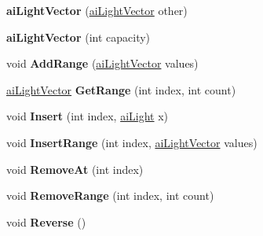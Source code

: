 \begin{DoxyCompactItemize}
\item 
\hypertarget{classai_light_vector_ac10f5a7cfb0ddbe7bda375740838a58e}{{\bfseries ai\+Light\+Vector} (\hyperlink{classai_light_vector}{ai\+Light\+Vector} other)}\label{classai_light_vector_ac10f5a7cfb0ddbe7bda375740838a58e}

\item 
\hypertarget{classai_light_vector_ae79283f10ffcfa603ce8a5c0c572d365}{{\bfseries ai\+Light\+Vector} (int capacity)}\label{classai_light_vector_ae79283f10ffcfa603ce8a5c0c572d365}

\item 
\hypertarget{classai_light_vector_a4a0e3aa1cef39c2d66b2d6bd88f3a000}{void {\bfseries Add\+Range} (\hyperlink{classai_light_vector}{ai\+Light\+Vector} values)}\label{classai_light_vector_a4a0e3aa1cef39c2d66b2d6bd88f3a000}

\item 
\hypertarget{classai_light_vector_a1e8e45350dd7da40476b076a62c96481}{\hyperlink{classai_light_vector}{ai\+Light\+Vector} {\bfseries Get\+Range} (int index, int count)}\label{classai_light_vector_a1e8e45350dd7da40476b076a62c96481}

\item 
\hypertarget{classai_light_vector_a8b177932ebc6fa37261c5fc2eda818fe}{void {\bfseries Insert} (int index, \hyperlink{structai_light}{ai\+Light} x)}\label{classai_light_vector_a8b177932ebc6fa37261c5fc2eda818fe}

\item 
\hypertarget{classai_light_vector_a608f61dc5db1955e195568f678ec0744}{void {\bfseries Insert\+Range} (int index, \hyperlink{classai_light_vector}{ai\+Light\+Vector} values)}\label{classai_light_vector_a608f61dc5db1955e195568f678ec0744}

\item 
\hypertarget{classai_light_vector_a57d92cdb24a60ef98cc128b4a83af6e9}{void {\bfseries Remove\+At} (int index)}\label{classai_light_vector_a57d92cdb24a60ef98cc128b4a83af6e9}

\item 
\hypertarget{classai_light_vector_a3853023d11bf17ed2377bcd873986219}{void {\bfseries Remove\+Range} (int index, int count)}\label{classai_light_vector_a3853023d11bf17ed2377bcd873986219}

\item 
\hypertarget{classai_light_vector_a2d5cb358bdaca35b290d3a5de609e1e7}{void {\bfseries Reverse} ()}\label{classai_light_vector_a2d5cb358bdaca35b290d3a5de609e1e7}


\end{DoxyCompactItemize}
